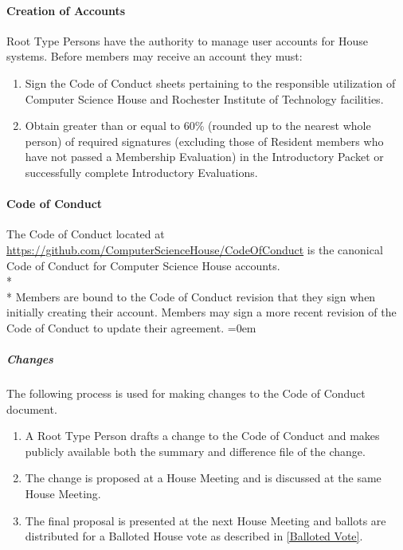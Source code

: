 \documentclass{article}
\newcommand{\asubsubsection}[1]{\paragraph{#1} \label{#1}}
\newcommand{\asubsubsubsection}[1]{\parindent=0em\subparagraph{#1} \label{#1}}
\begin{document}
\asubsubsection{Creation of Accounts}
Root Type Persons have the authority to manage user accounts for House systems.
Before members may receive an account they must:
\renewcommand{\theenumi}{\alph{enumi}} %
\begin{enumerate}
	\item Sign the Code of Conduct sheets pertaining to the responsible utilization of Computer Science House and Rochester Institute of Technology facilities.
	\item Obtain greater than or equal to 60\% (rounded up to the nearest whole person) of required signatures (excluding those of Resident members who have not passed a Membership Evaluation) in the Introductory Packet or successfully complete Introductory Evaluations.
\end{enumerate}

\asubsubsection{Code of Conduct}
The Code of Conduct located at \url{https://github.com/ComputerScienceHouse/CodeOfConduct} is the canonical Code of Conduct for Computer Science House accounts.
\\* \\*
Members are bound to the Code of Conduct revision that they sign when initially creating their account.
Members may sign a more recent revision of the Code of Conduct to update their agreement.
\asubsubsubsection{Changes}
The following process is used for making changes to the Code of Conduct document.
\begin{enumerate}
	\item A Root Type Person drafts a change to the Code of Conduct and makes publicly available both the summary and difference file of the change.
	\item The change is proposed at a House Meeting and is discussed at the same House Meeting.
	\item The final proposal is presented at the next House Meeting and ballots are distributed for a Balloted House vote as described in \ref{Balloted Vote}.
\end{enumerate}
\end{document}
